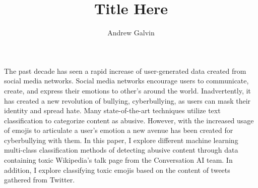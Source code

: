 \documentclass{12pt, a4paper}{article}
\title{Title Here}
\author{Andrew Galvin}
\begin{document}
\maketitle


The past decade has seen a rapid increase of user-generated data created from social media networks. Social media networks encourage users to communicate, create, and express their emotions to other's around the world. Inadvertently, it has created a new revolution of bullying, cyberbullying, as users can mask their identity and spread hate. Many state-of-the-art techniques utilize text classification to categorize content as abusive. However, with the increased usage of emojis to articulate a user's emotion a new avenue has been created for cyberbullying with them. In this paper, I explore different machine learning multi-class classification methods of detecting abusive content through data containing toxic Wikipedia's talk page from the Conversation AI team. In addition, I explore classifying toxic emojis based on the content of tweets gathered from Twitter.
\end{document}
